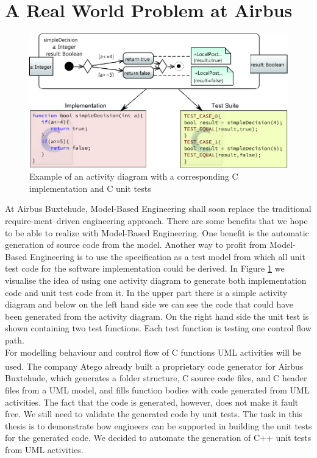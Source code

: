 \section{A Real World Problem at Airbus}
\begin{figure}
\label{fig:Act2Code+Tests}
\includegraphics[width=\textwidth]{./pics/Activity2Code+Test2.pdf}
\caption{Example of an activity diagram with a corresponding C implementation and C unit tests}
\end{figure}
At Airbus Buxtehude, Model-Based Engineering shall soon replace the traditional require-ment--driven engineering approach. There are some benefits that we hope to be able to realize with Model-Based Engineering. One benefit is the automatic generation of source code from the model. Another way to profit from Model-Based Engineering is to use the specification as a test model from which all unit test code for the software implementation could be derived. In Figure \ref{fig:Act2Code+Tests} we visualise the idea of using one activity diagram to generate both implementation code and unit test code from it. In the upper part there is a simple activity diagram and below on the left hand side we can see the code that could have been generated from the activity diagram. On the right hand side the unit test is shown containing two test functions. Each test function is testing one control flow path. \\
For modelling behaviour and control flow of C functions UML activities will be used. The company Atego\textsuperscript{\textregistered} already built a proprietary code generator for Airbus Buxtehude, which generates a folder structure, C source code files, and C header files from a UML model, and fills function bodies with code generated from UML activities. The fact that the code is generated, however, does not make it fault free. We still need to validate the generated code by unit tests. The task in this thesis is to demonstrate how engineers can be supported in building the unit tests for the generated code. We decided to automate the generation of C++ unit tests from UML activities.\\
